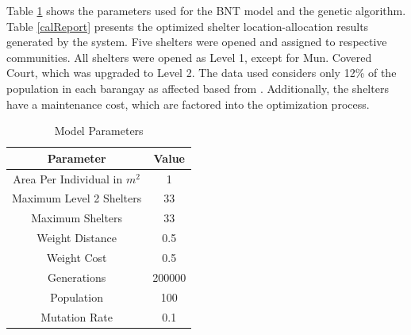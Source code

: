 \documentclass[12pt,a4paper,]{article}
\begin{document}
	
	Table \ref{modelParams} shows the parameters used for the BNT model and the genetic algorithm. Table \ref{calReport} presents the optimized shelter location-allocation results generated by the system. Five shelters were opened and assigned to respective communities. All shelters were opened as Level 1, except for Mun. Covered Court, which was upgraded to Level 2. The data used considers only 12\% of the population in each barangay as affected based from \textcite{Opdyke2024}. Additionally, the shelters have a maintenance cost, which are factored into the optimization process.
	
	\begin{table}[h]
		\centering
		\caption{Model Parameters}
		\label{modelParams}
		\begin{tabular}{|c|c|}
			\hline
			\textbf{Parameter} & \textbf{Value} \\ \hline
			Area Per Individual in $m^2$ & 1 \\ 
			Maximum Level 2 Shelters  & 33 \\ 
			Maximum Shelters & 33 \\ 
			Weight Distance & 0.5 \\ 
			Weight Cost & 0.5 \\ 
			Generations & 200000 \\ 
			Population & 100 \\ 
			Mutation Rate & 0.1 \\ \hline
		\end{tabular}
	\end{table}
	
\end{document}
